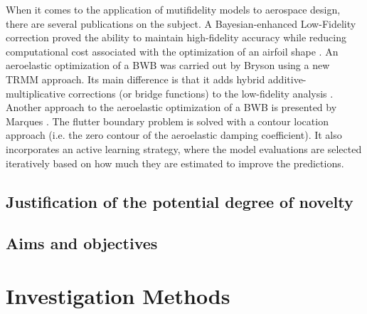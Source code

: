 When it comes to the application of mutifidelity models to aerospace design, there are several publications on the subject. A Bayesian-enhanced Low-Fidelity correction proved the ability to maintain high-fidelity accuracy while reducing
computational cost associated with the optimization of an airfoil shape \cite{fischer2018bayesian}. An aeroelastic optimization of a BWB was carried out by Bryson \cite{Bryson2019} using a new TRMM approach. Its main difference is that it adds hybrid additive-multiplicative corrections (or bridge functions) to the low-fidelity analysis \cite{Bryson2019a}. Another approach to the aeroelastic optimization of a BWB is presented by Marques \cite{Marques2019}. The flutter boundary problem is solved with a contour location approach (i.e. the zero contour of the aeroelastic damping coefficient). It also incorporates an active learning strategy, where the model evaluations are selected iteratively based on how much they are estimated to improve the predictions.

\subsection{Justification of the potential degree of novelty}
\subsection{Aims and objectives}

\section{Investigation Methods}
\label{sec:unchapitre}
 



